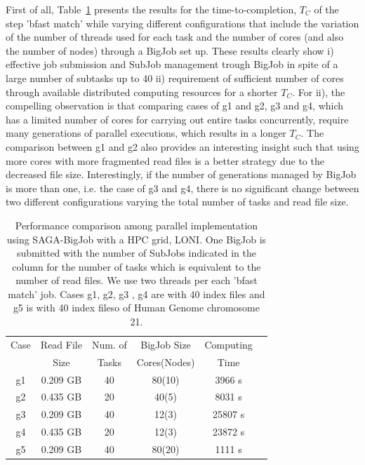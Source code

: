 \documentclass{acm_proc_article-sp}
\begin{document}

First of all, Table~\ref{table:bigjob-loni} presents the results for the time-to-completion, $T_C$ of the step 'bfast match' while varying different
configurations that include the variation of the number of threads
used for each task and the number of cores (and also the number of
nodes) through a BigJob set up\cite{ecmls10,saga-ccgrid10}.  These results clearly show i) effective job submission and
SubJob management trough BigJob in spite of a large number of
subtasks up to 40 ii) requirement of sufficient number of cores
through available distributed computing resources for a shorter $T_C$.  For ii), the compelling observation is that comparing cases of g1 and g2, g3 and g4, which has a limited number of cores for carrying out entire tasks concurrently, require many generations of parallel executions, which results in a longer $T_C$.  The comparison between g1 and g2 also provides an interesting insight such that using more cores with more fragmented read files is a better strategy due to the decreased file size.  Interestingly, if the number of generations managed by BigJob is more than one, i.e. the case of g3 and g4, there is no significant change between two different configurations varying the total number of tasks and read file size.  



 \begin{table}
 \begin{tabular}{|c|c|c|c|c|c |} 
 \hline 
Case & Read File  &  Num. of & BigJob Size   &  Computing  \\
   & Size & Tasks  & Cores(Nodes)  & Time \\
   \hline
g1 & 0.209 GB  &   40 &  80(10) & 3966 s \\
g2 & 0.435 GB    &  20 & 40(5) & 8031 s\\
g3  & 0.209 GB & 40  & 12(3) & 25807 s \\
g4 & 0.435 GB & 20  & 12(3) & 23872 s  \\
g5 & 0.209 GB & 40 & 80(20) & 1111 s \\

\hline
\end{tabular}
\caption{Performance comparison among parallel implementation using
  SAGA-BigJob with a HPC grid, LONI. One BigJob is submitted with the
  number of SubJobs indicated in the column for the number of tasks
  which is equivalent to the number of read files. We use two threads
  per each 'bfast   match' job. Cases g1, g2, g3 , g4 are with 40 index files and g5 is with 40 index fileso of
  Human Genome chromosome 21.}
  \label{table:bigjob-loni} 
\end{table}
\end{document}
